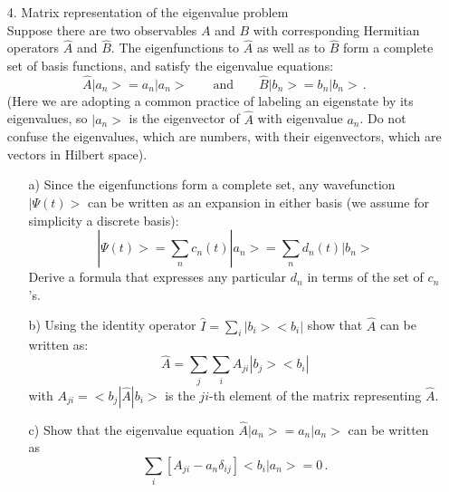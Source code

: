 \documentclass[11pt]{article}
\begin{document}
\begin{itemize}
\begin{itemize}
(Hints: (i) In this class we did not and we will not consider problems, in which the potential is time-dependent. Thus, 
you can assume that $V(x,t) = V(x)$. (ii) In the last term of the right hand side ${\partial {\hat A}}/{\partial t}$ is the derivative of the {\it operator}, and only of the operator, with respect of time.)
\end{itemize}
%
\vspace*{1cm}
%
\centerline{\bf - Please note: There is another problem on the next page -}
\newpage
%
\item[4.] Matrix representation of the eigenvalue problem\\
Suppose there are two observables $A$ and $B$ with corresponding Hermitian operators ${\hat A}$ and ${\hat B}$. The eigenfunctions to ${\hat A}$ as well as to ${\hat B}$ form a complete set of basis functions, and satisfy the eigenvalue equations:
\begin{displaymath}
{\hat A} |a_n> = a_n |a_n> \qquad \mbox{and} \qquad {\hat B} |b_n> = b_n |b_n>\, .
\end{displaymath}
(Here we are adopting a common practice of labeling an eigenstate by its eigenvalues, so $|a_n>$ is the eigenvector of ${\hat A}$ with eigenvalue $a_n$. Do not confuse the eigenvalues, which are numbers, with their eigenvectors, which are vectors in Hilbert space).
\begin{itemize}
\item[a)]
Since the eigenfunctions form a complete set, any wavefunction $|\Psi(t)>$ can be written as an expansion in either basis (we assume for simplicity a discrete basis):
\begin{displaymath}
|\Psi (t)> = \sum\limits_{n} c_n(t) |a_n> = \sum\limits_{n} d_n(t) |b_n>
\end{displaymath}
Derive a formula that expresses any particular $d_n$ in terms of the set of $c_n$'s.
\item[b)]
Using the identity operator ${\hat I} = \sum\limits_i |b_i><b_i|$
show that ${\hat A}$ can be written as:
\begin{displaymath}
{\hat A} = \sum\limits_j\sum\limits_i A_{ji}|b_j><b_i|
\end{displaymath}
with $A_{ji} = <b_j|{\hat A}|b_i>$ is the $ji$-th element of the matrix representing ${\hat A}$.
\item[c)]
Show that the eigenvalue equation ${\hat A} |a_n> = a_n |a_n>$
can be written as
\begin{equation}
\sum\limits_i \left[A_{ji} - a_n \delta_{ij}\right] <b_i|a_n> = 0\, .

\end{equation}
\end{itemize}
\end{itemize}
\end{document}
